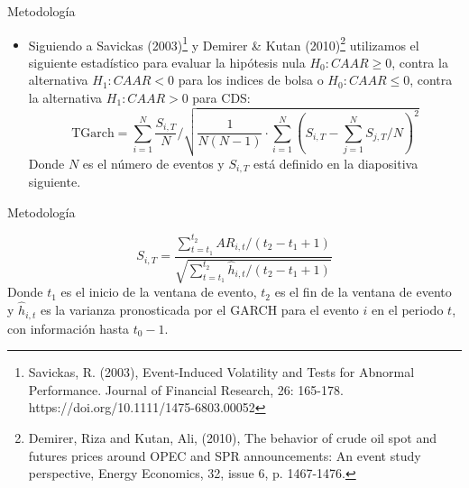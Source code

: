 \documentclass{beamer}
\begin{document}
\begin{frame}{Metodología}
\begin{itemize}
\item Siguiendo a Savickas (2003)\footnote{Savickas, R. (2003), Event-Induced Volatility and Tests for Abnormal Performance. Journal of Financial Research, 26: 165-178. https://doi.org/10.1111/1475-6803.00052} y Demirer \& Kutan (2010)\footnote{Demirer, Riza and Kutan, Ali, (2010), The behavior of crude oil spot and futures prices around OPEC and SPR announcements: An event study perspective, Energy Economics, 32, issue 6, p. 1467-1476.} utilizamos el siguiente estadístico para evaluar la hipótesis nula $H_0: CAAR\geq0$, contra la alternativa $H_1: CAAR<0$ para los indices de bolsa o $H_0: CAAR\leq 0$, contra la alternativa $H_1: CAAR>0$ para CDS:
\begin{equation}
\text {TGarch}=\sum_{i=1}^N \frac{S_{i, T}}{N} / \sqrt{\frac{1}{N(N-1)} \cdot \sum_{i=1}^N\left(S_{i, T}-\sum_{j=1}^N S_{j, T} / N\right)^2}
\end{equation}
Donde $N$ es el número de eventos y $S_{i,T}$ está definido en la diapositiva siguiente.
\end{itemize}
\end{frame}

\begin{frame}{Metodología}

\begin{equation}
        S_{i,T} = \frac{\sum_{t=t_1}^{t_2}AR_{i,t}/(t_2-t_1+1)}{\sqrt{\sum_{t=t_1}^{t_2}\hat{h}_{i,t}/(t_2-t_1+1)}} \label{eq:sit}
    \end{equation}
Donde $t_1$ es el inicio de la ventana de evento, $t_2$ es el fin de la ventana de evento y $\hat{h}_{i,t}$ es la varianza pronosticada por el GARCH para el evento $i$ en el periodo $t$, con información hasta $t_0-1$.

\end{frame}
\end{document}
